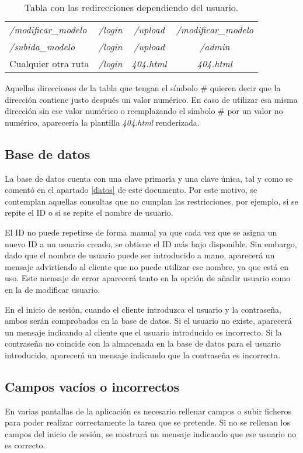 \begin{table}[h]
\begin{center}
\begin{tabular}{ l c c c }
			\textit{/modificar\_modelo} & \textit{/login} & \textit{/upload} & \textit{/modificar\_modelo} \\ 
			\textit{/subida\_modelo} & \textit{/login} & \textit{/upload} & \textit{/admin} \\
			Cualquier otra ruta & \textit{/login} & \textit{404.html} & \textit{404.html} \\ \bottomrule
\end{tabular}
		\caption{Tabla con las redirecciones dependiendo del usuario.}
		\label{tab:redirecciones}
	\end{center}
\end{table}

Aquellas direcciones de la tabla que tengan el símbolo \# quieren decir que la dirección contiene justo después un valor numérico. En caso de utilizar esa misma dirección sin ese valor numérico o reemplazando el símbolo \# por un valor no numérico, aparecería la plantilla \textit{404.html} renderizada.

\subsection{Base de datos}
La base de datos cuenta con una clave primaria y una clave única, tal y como se comentó en el apartado \ref{datos} de este documento. Por este motivo, se contemplan aquellas consultas que no cumplan las restricciones, por ejemplo, si se repite el ID o si se repite el nombre de usuario.

El ID no puede repetirse de forma manual ya que cada vez que se asigna un nuevo ID a un usuario creado, se obtiene el ID más bajo disponible. Sin embargo, dado que el nombre de usuario puede ser introducido a mano, aparecerá un mensaje advirtiendo al cliente que no puede utilizar ese nombre, ya que está en uso. Este mensaje de error aparecerá tanto en la opción de añadir usuario como en la de modificar usuario.

En el inicio de sesión, cuando el cliente introduzca el usuario y la contraseña, ambos serán comprobados en la base de datos. Si el usuario no existe, aparecerá un mensaje indicando al cliente que el usuario introducido es incorrecto. Si la contraseña no coincide con la almacenada en la base de datos para el usuario introducido, aparecerá un mensaje indicando que la contraseña es incorrecta.

\subsection{Campos vacíos o incorrectos}
En varias pantallas de la aplicación es necesario rellenar campos o subir ficheros para poder realizar correctamente la tarea que se pretende. Si no se rellenan los campos del inicio de sesión, se mostrará un mensaje indicando que ese usuario no es correcto.

